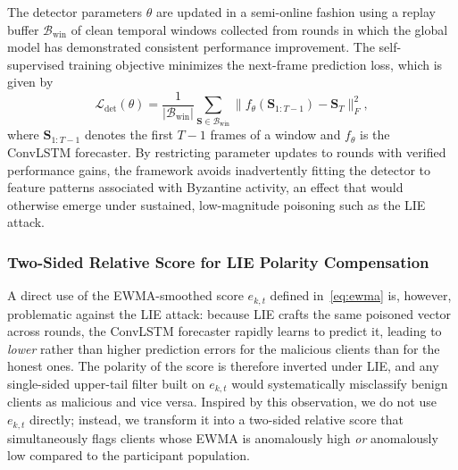 \documentclass[journal]{IEEEtran}
\begin{document}
The detector parameters $\theta$ are updated in a semi-online fashion using a replay buffer $\mathcal{B}_{\text{win}}$ of clean temporal windows collected from rounds in which the global model has demonstrated consistent performance improvement. The self-supervised training objective minimizes the next-frame prediction loss, which is given by
\begin{equation}
\mathcal{L}_{\text{det}}(\theta) = \frac{1}{|\mathcal{B}_{\text{win}}|} \sum_{\mathbf{S} \in \mathcal{B}_{\text{win}}} \|f_\theta(\mathbf{S}_{1:T-1}) - \mathbf{S}_T\|_F^2,
\label{eq:det_loss}
\end{equation}
where $\mathbf{S}_{1:T-1}$ denotes the first $T-1$ frames of a window and $f_\theta$ is the ConvLSTM forecaster. By restricting parameter updates to rounds with verified performance gains, the framework avoids inadvertently fitting the detector to feature patterns associated with Byzantine activity, an effect that would otherwise emerge under sustained, low-magnitude poisoning such as the LIE attack.

\subsubsection{Two-Sided Relative Score for LIE Polarity Compensation}
A direct use of the EWMA-smoothed score $e_{k,t}$ defined in~\eqref{eq:ewma} is, however, problematic against the LIE attack: because LIE crafts the same poisoned vector across rounds, the ConvLSTM forecaster rapidly learns to predict it, leading to \emph{lower} rather than higher prediction errors for the malicious clients than for the honest ones. The polarity of the score is therefore inverted under LIE, and any single-sided upper-tail filter built on $e_{k,t}$ would systematically misclassify benign clients as malicious and vice versa. Inspired by this observation, we do not use $e_{k,t}$ directly; instead, we transform it into a two-sided relative score that simultaneously flags clients whose EWMA is anomalously high \emph{or} anomalously low compared to the participant population.
\end{document}
